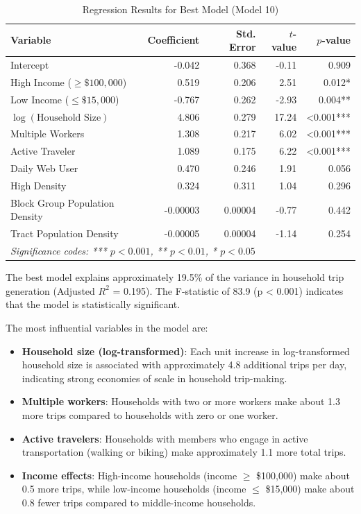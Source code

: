 \documentclass[12pt]{article}
\begin{document}
\begin{table}[h]
\centering
\caption{Regression Results for Best Model (Model 10)}
\label{tab:best_model}
\begin{tabular}{lrrrr}
\toprule
Variable & Coefficient & Std. Error & $t$-value & $p$-value \\
\midrule
Intercept & -0.042 & 0.368 & -0.11 & 0.909 \\
High Income ($\geq\$100,000$) & 0.519 & 0.206 & 2.51 & 0.012* \\
Low Income ($\leq\$15,000$) & -0.767 & 0.262 & -2.93 & 0.004** \\
$\log(\text{Household Size})$ & 4.806 & 0.279 & 17.24 & <0.001*** \\
Multiple Workers & 1.308 & 0.217 & 6.02 & <0.001*** \\
Active Traveler & 1.089 & 0.175 & 6.22 & <0.001*** \\
Daily Web User & 0.470 & 0.246 & 1.91 & 0.056 \\
High Density & 0.324 & 0.311 & 1.04 & 0.296 \\
Block Group Population Density & -0.00003 & 0.00004 & -0.77 & 0.442 \\
Tract Population Density & -0.00005 & 0.00004 & -1.14 & 0.254 \\
\bottomrule
\multicolumn{5}{l}{\textit{Significance codes: *** $p<0.001$, ** $p<0.01$, * $p<0.05$}}
\end{tabular}
\end{table}

The best model explains approximately 19.5\% of the variance in household trip generation (Adjusted $R^2$ = 0.195). The F-statistic of 83.9 (p < 0.001) indicates that the model is statistically significant.

The most influential variables in the model are:
\begin{itemize}
    \item \textbf{Household size (log-transformed)}: Each unit increase in log-transformed household size is associated with approximately 4.8 additional trips per day, indicating strong economies of scale in household trip-making.
    \item \textbf{Multiple workers}: Households with two or more workers make about 1.3 more trips compared to households with zero or one worker.
    \item \textbf{Active travelers}: Households with members who engage in active transportation (walking or biking) make approximately 1.1 more total trips.
    \item \textbf{Income effects}: High-income households (income $\geq$ \$100,000) make about 0.5 more trips, while low-income households (income $\leq$ \$15,000) make about 0.8 fewer trips compared to middle-income households.
\end{itemize}
\end{document}
